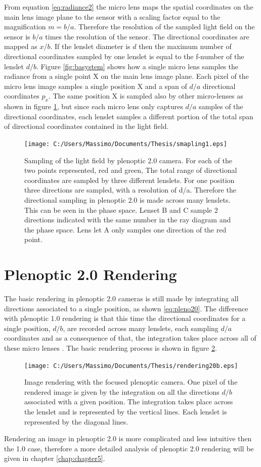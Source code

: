    From equation \ref{eq:radiance2} the micro lens maps the spatial coordinates on the main lens image plane to the sensor with a scaling factor equal to the magnification $m=b/a$. Therefore the resolution of the sampled light field on the sensor is $b/a$ times the resolution of the sensor. The directional coordinates are mapped as $x/b$. If the lenslet diameter is $d$ then the maximum number of directional coordinates sampled by one lenslet is equal to the f-number of the lenslet $d/b$. Figure \ref{fig:basystem} shows how a single micro lens samples the radiance from a single point X on the main lens image plane. Each pixel of the micro lens image samples a single position X and a span of $d/a$ directional coordinates $p_x$. The same position X is sampled also by other micro-lenses as shown in figure \ref{fig:phaseba}, but since each micro lens only captures $d/a$ samples of the directional coordinates, each lenslet samples a different portion of the total span of directional coordinates contained in the light field.
   \begin{figure}[H]
   	\centering
   	\texttt{[image: C:/Users/Massimo/Documents/Thesis/smapling1.eps]}
   	\caption{\label{fig:phaseba} Sampling of the light field by plenoptic 2.0 camera. For each of the two points represented, red and green, The total range of directional coordinates are sampled by three  different lenslets. For one position three directions are sampled, with a resolution of d/a. Therefore the directional sampling in plenoptic 2.0 is made across many lenslets. This can be seen in the phase space. Lenset B and C sample 2 directions indicated with the same number in the ray diagram and the phase space. Lens let A only samples one direction of the red point.   }
   \end{figure}
   \section{Plenoptic 2.0 Rendering}
   \label{sec:rendering201}
   The basic rendering in plenoptic 2.0 cameras is still made by integrating all directions associated to a single position, as shown \ref{eq:pleno20}. The difference with plenoptic 1.0 rendering is that this time the directional coordinates for a single position, $d/b$, are recorded across many lenslets, each sampling $d/a$ coordinates and as a consequence of that, the integration takes place across all of these micro lenses \cite{georgiev2006light}. The basic rendering process is shown in figure \ref{fig:render20}.
   \begin{figure}[H]
   	\centering
   	\texttt{[image: C:/Users/Massimo/Documents/Thesis/rendering20b.eps]}
   	\caption{\label{fig:render20} Image rendering with the focused plenoptic camera. One pixel of the rendered image is given by the integration on all the directions $d/b$ associated with a given position. The integration takes place across the lenslet and is represented by the vertical lines. Each lenslet is represented by the diagonal lines. }
   \end{figure}
   Rendering an image in plenoptic 2.0 is more complicated and less intuitive then the 1.0 case, therefore a more detailed analysis of plenoptic 2.0 rendering will be given in chapter \ref{chap:chapter5}.
